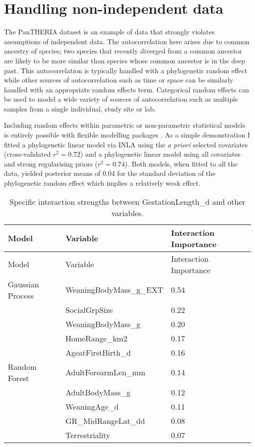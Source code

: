 \documentclass[10pt,]{article}
\begin{document}
\section{Handling non-independent data}\label{handling-non-independent-data}

The PanTHERIA dataset is an example of data that strongly violates assumptions of independent data. The autocorrelation here arises due to common ancestry of species; two species that recently diverged from a common ancestor are likely to be more similar than species whose common ancestor is in the deep past. This autocorrelation is typically handled with a phylogenetic random effect while other sources of autocorrelation such as time or space can be similarly handled with an appropriate random effects term. Categorical random effects can be used to model a wide variety of sources of autocorrelation such as multiple samples from a single individual, study site or lab.

Including random effects within parametric or non-parametric statistical models is entirely possible with flexible modelling packages \citep{stan, INLA, glmmTMB, tmb}. As a simple demonstration I fitted a phylogenetic linear model via INLA \citep{INLA} using the \emph{a priori} selected covariates (cross-validated \(r^2 = 0.72\)) and a phylogenetic linear model using all covariates and strong regularising priors (\(r^2 = 0.74\)). Both models, when fitted to all the data, yielded posterior means of 0.04 for the standard deviation of the phylogenetic random effect which implies a relatively weak effect.

\begin{table}[t!]
\begin{longtable}[c]{@{}lll@{}}
\caption{Specific interaction strengths between GestationLength\_d and other variables. \label{tbl:specificinter}}\tabularnewline
\toprule
Model & Variable & Interaction Importance\tabularnewline
\midrule
\endfirsthead
\toprule
Model & Variable & Interaction Importance\tabularnewline
\midrule
\endhead
Gaussian Process & WeaningBodyMass\_g\_EXT & 0.54\tabularnewline
& SocialGrpSize & 0.22\tabularnewline
& WeaningBodyMass\_g & 0.20\tabularnewline
& HomeRange\_km2 & 0.17\tabularnewline
& AgeatFirstBirth\_d & 0.16\tabularnewline
Random Forest & AdultForearmLen\_mm & 0.14\tabularnewline
& AdultBodyMass\_g & 0.12\tabularnewline
& WeaningAge\_d & 0.11\tabularnewline
& GR\_MidRangeLat\_dd & 0.08\tabularnewline
& Terrestriality & 0.07\tabularnewline
\bottomrule
\end{longtable}
\end{table}
  
\end{document}

